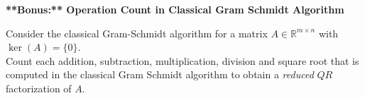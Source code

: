 \textbf{**Bonus:** Operation Count in Classical Gram Schmidt Algorithm}

Consider the classical Gram-Schmidt algorithm for a matrix $A \in \mathbb{R}^{m \times n}$ with $\ker(A) = \{0\}$. \\
Count each addition, subtraction, multiplication, division and square root that is computed in the classical Gram Schmidt algorithm to obtain a \textit{reduced} $QR$ factorization of $A$. 


